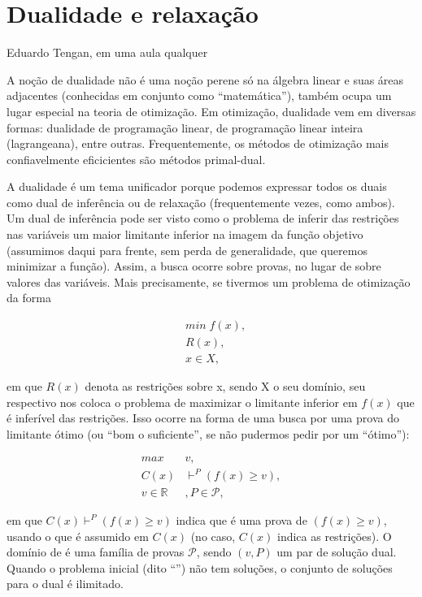 \documentclass{article}
\begin{document}
\section{Dualidade e relaxação}

\epigraph{}{Eduardo Tengan, em uma aula qualquer}

A noção de dualidade não é uma noção perene só na álgebra linear e suas áreas adjacentes (conhecidas
em conjunto como ``matemática''), também ocupa um lugar especial na teoria de otimização. Em
otimização, dualidade vem em diversas formas: dualidade de programação linear, de programação
linear inteira (lagrangeana), entre outras. Frequentemente, os métodos de otimização mais
confiavelmente eficicientes são métodos primal-dual.

A dualidade é um tema unificador porque podemos expressar todos os duais como dual de inferência ou
de relaxação (frequentemente vezes, como ambos). Um dual de inferência pode ser visto como o
problema de inferir das restrições nas variáveis um maior limitante inferior na imagem da função
objetivo (assumimos daqui para frente, sem perda de generalidade, que queremos minimizar a função). Assim, a busca ocorre
sobre provas, no lugar de sobre valores das variáveis. Mais precisamente, se tivermos um problema de
otimização da forma

\begin{align*}
  &  min \; f(x),\\
  &  R(x),\\
  &  x \in X,
\end{align*}

\noindent em que $R(x)$ denota as restrições sobre x, sendo X o seu domínio, seu respectivo
 nos coloca o problema de maximizar o limitante inferior em $f(x)$ que
é inferível das restrições. Isso ocorre na forma de uma busca por uma prova do limitante ótimo (ou
``bom o suficiente'', se não pudermos pedir por um ``ótimo''):

\begin{align*}
  max \; & v,\\
  C(x) & \vdash^{P} (f(x) \geq v),\\
  v \in \mathbb{R}&, P \in \mathcal{P},
\end{align*}

\noindent em que $C(x) \vdash^{P} (f(x) \geq v)$ indica que  é uma prova de $(f(x) \geq v)$,
usando o que é assumido em $C(x)$ (no caso, $C(x)$ indica as restrições). O domínio de  é uma família de provas $\mathcal{P}$, sendo
$(v,P)$ um par de solução dual. Quando o problema inicial (dito ``'') não tem
soluções, o conjunto de soluções para o dual é ilimitado.
\end{document}
